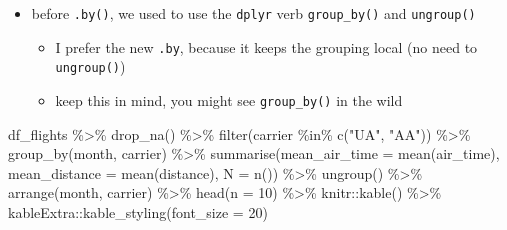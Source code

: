 \documentclass[
  letterpaper,
  DIV=11]{scrartcl}
\newenvironment{Shaded}{\begin{snugshade}}{\end{snugshade}}
\newcommand{\AttributeTok}[1]{\textcolor[rgb]{0.40,0.45,0.13}{#1}}
\newcommand{\DecValTok}[1]{\textcolor[rgb]{0.68,0.00,0.00}{#1}}
\newcommand{\FunctionTok}[1]{\textcolor[rgb]{0.28,0.35,0.67}{#1}}
\newcommand{\NormalTok}[1]{\textcolor[rgb]{0.00,0.23,0.31}{#1}}
\newcommand{\SpecialCharTok}[1]{\textcolor[rgb]{0.37,0.37,0.37}{#1}}
\newcommand{\StringTok}[1]{\textcolor[rgb]{0.13,0.47,0.30}{#1}}
\providecommand{\tightlist}{%
  \setlength{\itemsep}{0pt}\setlength{\parskip}{0pt}}\usepackage{longtable,booktabs,array}
\begin{document}
\begin{tcolorbox}[enhanced jigsaw, left=2mm, breakable, colframe=quarto-callout-note-color-frame, toprule=.15mm, toptitle=1mm, titlerule=0mm, leftrule=.75mm, title=\textcolor{quarto-callout-note-color}{\faInfo}\hspace{0.5em}{\texttt{group\_by()}}, colbacktitle=quarto-callout-note-color!10!white, colback=white, coltitle=black, arc=.35mm, bottomtitle=1mm, opacityback=0, rightrule=.15mm, bottomrule=.15mm, opacitybacktitle=0.6]

\begin{itemize}
\tightlist
\item
  before \texttt{.by()}, we used to use the \texttt{dplyr} verb
  \texttt{group\_by()} and \texttt{ungroup()}

  \begin{itemize}
  \tightlist
  \item
    I prefer the new \texttt{.by}, because it keeps the grouping local
    (no need to \texttt{ungroup()})
  \item
    keep this in mind, you might see \texttt{group\_by()} in the wild
  \end{itemize}
\end{itemize}

\begin{Shaded}
\begin{Highlighting}[numbers=left,,]
\NormalTok{df\_flights }\SpecialCharTok{\%\textgreater{}\%} 
  \FunctionTok{drop\_na}\NormalTok{() }\SpecialCharTok{\%\textgreater{}\%}
  \FunctionTok{filter}\NormalTok{(carrier }\SpecialCharTok{\%in\%} \FunctionTok{c}\NormalTok{(}\StringTok{"UA"}\NormalTok{, }\StringTok{"AA"}\NormalTok{)) }\SpecialCharTok{\%\textgreater{}\%} 
  \FunctionTok{group\_by}\NormalTok{(month, carrier) }\SpecialCharTok{\%\textgreater{}\%} 
  \FunctionTok{summarise}\NormalTok{(}\AttributeTok{mean\_air\_time =} \FunctionTok{mean}\NormalTok{(air\_time),}
            \AttributeTok{mean\_distance =} \FunctionTok{mean}\NormalTok{(distance),}
            \AttributeTok{N =} \FunctionTok{n}\NormalTok{()) }\SpecialCharTok{\%\textgreater{}\%} 
  \FunctionTok{ungroup}\NormalTok{() }\SpecialCharTok{\%\textgreater{}\%} 
  \FunctionTok{arrange}\NormalTok{(month, carrier) }\SpecialCharTok{\%\textgreater{}\%} 
  \FunctionTok{head}\NormalTok{(}\AttributeTok{n =} \DecValTok{10}\NormalTok{) }\SpecialCharTok{\%\textgreater{}\%} 
\NormalTok{  knitr}\SpecialCharTok{::}\FunctionTok{kable}\NormalTok{() }\SpecialCharTok{\%\textgreater{}\%} 
\NormalTok{  kableExtra}\SpecialCharTok{::}\FunctionTok{kable\_styling}\NormalTok{(}\AttributeTok{font\_size =} \DecValTok{20}\NormalTok{) }
\end{Highlighting}
\end{Shaded}


\end{tcolorbox}
\end{document}
